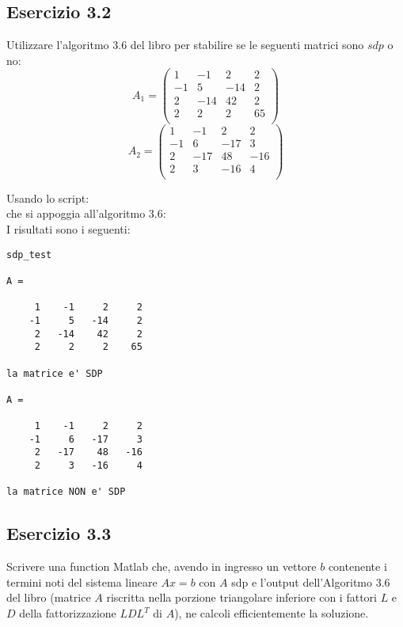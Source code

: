 	\subsection{Esercizio 3.2}

Utilizzare l'algoritmo 3.6 del libro per stabilire se le seguenti matrici sono $sdp$ o no:
	\[	
		A_1 = 
		\begin{pmatrix}
			1&-1&2&2 \\
			-1&5&-14&2\\
			2&-14&42&2\\
			2&2&2&65\\
		\end{pmatrix}
	\]
	\[		
		A_2 =
		\begin{pmatrix}
			1&-1&2&2\\
			-1&6&-17&3\\
			2&-17&48&-16\\
			2&3&-16&4\\
		\end{pmatrix}
	\]

Usando lo script: \\

che si appoggia all'algoritmo 3.6:\\

I risultati sono i seguenti:\\
\begin{lstlisting}[frame=single]
sdp_test

A =

     1    -1     2     2
    -1     5   -14     2
     2   -14    42     2
     2     2     2    65

la matrice e' SDP

A =

     1    -1     2     2
    -1     6   -17     3
     2   -17    48   -16
     2     3   -16     4

la matrice NON e' SDP
\end{lstlisting}


	\subsection{Esercizio 3.3}

Scrivere una function Matlab che, avendo in ingresso un vettore $b$ contenente i termini noti del sistema lineare $Ax = b$ con $A$ sdp e l’output dell’Algoritmo 3.6 del libro (matrice $A$ riscritta nella porzione triangolare inferiore con i fattori $L$ e $D$ della fattorizzazione $LDL^{T}$ di $A$), ne calcoli efficientemente la soluzione.

